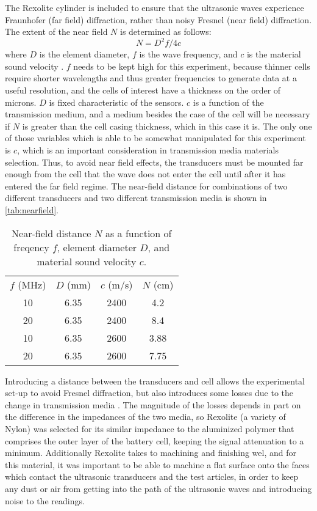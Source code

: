 The Rexolite cylinder is included to ensure that the ultrasonic waves experience Fraunhofer (far field) diffraction, rather than noisy Fresnel (near field) diffraction. The extent of the near field $N$ is determined as follows:
$$ N = D^2 f / 4c $$
where $D$ is the element diameter, $f$ is the wave frequency, and $c$ is the material sound velocity \cite{OLYMPUS}.
$f$ needs to be kept high for this experiment, because thinner cells require shorter wavelengths and thus greater frequencies to generate data at a useful resolution, and the cells of interest have a thickness on the order of microns. $D$ is fixed characteristic of the sensors. $c$ is a function of the transmission medium, and a medium besides the case of the cell will be necessary if $N$ is greater than the cell casing thickness, which in this case it is. The only one of those variables which is able to be somewhat manipulated for this experiment is $c$, which is an important consideration in transmission media materials selection. Thus, to avoid near field effects, the transducers must be mounted far enough from the cell that the wave does not enter the cell until after it has entered the far field regime. The near-field distance for combinations of two different transducers and two different transmission media is shown in \autoref{tab:nearfield}.

\begin{table}[]
    \centering
    \begin{tabular}{c|c|c|c}
         $f$ (MHz) & $D$ (mm) & $c$ (m/s) & $N$ (cm) \\
         10 & 6.35 & 2400 & 4.2 \\
         20 & 6.35 & 2400 & 8.4 \\
         10 & 6.35 & 2600 & 3.88 \\
         20 & 6.35 & 2600 & 7.75 \\
    \end{tabular}
    \caption{Near-field distance $N$ as a function of freqency $f$, element diameter $D$, and material sound velocity $c$.}
    \label{tab:nearfield}
\end{table} 

Introducing a distance between the transducers and cell allows the experimental set-up to avoid Fresnel diffraction, but also introduces some losses due to the change in transmission media . The magnitude of the losses depends in part on the difference in the impedances of the two media, so Rexolite (a variety of Nylon) was selected for its similar impedance to the aluminized polymer that comprises the outer layer of the battery cell, keeping the signal attenuation to a minimum. Additionally Rexolite takes to machining and finishing wel, and for this material, it was important to be able to machine a flat surface onto the faces which contact the ultrasonic transducers and the test articles, in order to keep any dust or air from getting into the path of the ultrasonic waves and introducing noise to the readings.
 
